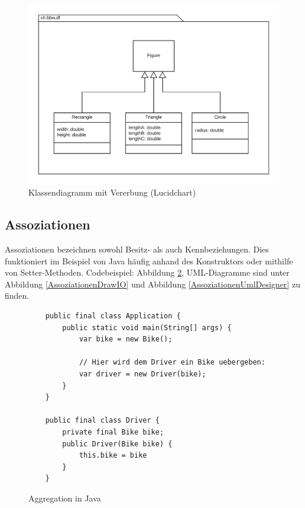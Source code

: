 \documentclass[a4paper, titlepage]{scrartcl}
\begin{document}
    \begin{figure}
        \includegraphics[width=\textwidth]{Klassendiagramm1c}
        \caption{Klassendiagramm mit Vererbung (Lucidchart)}
        \label{VererbungLucidchart}
    \end{figure}
    
    \subsection{Assoziationen}
    Assoziationen bezeichnen sowohl Besitz- als auch Kennbeziehungen.
    Dies funktioniert im Beispiel von Java häufig anhand des Konstruktors
    oder mithilfe von Setter-Methoden. Codebeispiel: Abbildung \ref{AggregationJava},
    UML-Diagramme sind unter Abbildung \ref{AssoziationenDrawIO} und
    Abbildung \ref{AssoziationenUmlDesigner} zu finden.

    \begin{figure}
    \begin{lstlisting}
    public final class Application {
        public static void main(String[] args) {
            var bike = new Bike();

            // Hier wird dem Driver ein Bike uebergeben:
            var driver = new Driver(bike);
        }
    }

    public final class Driver {
        private final Bike bike;
        public Driver(Bike bike) {
            this.bike = bike
        }        
    }
    \end{lstlisting}
    \caption{Aggregation in Java}
    \label{AggregationJava}
    \end{figure}
\end{document}
